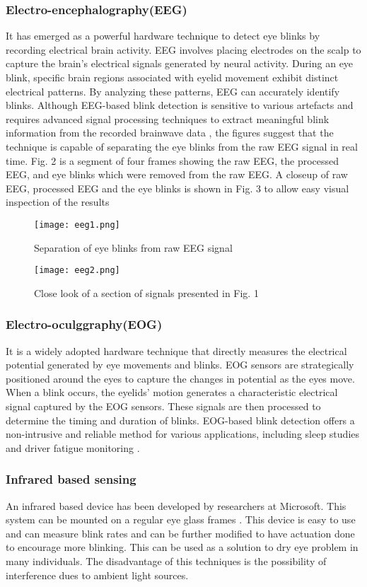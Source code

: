 \documentclass[conference]{IEEEtran}
\begin{document}
\subsubsection{Electro-encephalography(EEG)}
It has emerged as a
powerful hardware technique to detect eye blinks by recording
electrical brain activity. EEG involves placing electrodes on
the scalp to capture the brain’s electrical signals generated
by neural activity. During an eye blink, specific brain regions
associated with eyelid movement exhibit distinct electrical patterns. By analyzing these patterns, EEG can accurately identify blinks. Although EEG-based blink detection is sensitive to various artefacts and requires advanced signal processing techniques to extract meaningful blink information from the recorded brainwave data \cite {EEG2}, the figures suggest that the technique is capable of separating the eye blinks from the raw EEG signal in real time. Fig. 2 is a segment of four frames showing the raw EEG, the processed EEG, and eye blinks which were removed from the raw EEG. A closeup of raw EEG, processed EEG and the eye blinks is shown in Fig. 3 to allow easy visual inspection of the results \cite {EEG}

\begin{figure}[htbp]
\centerline{\texttt{[image: eeg1.png]}}
\caption{  Separation of eye blinks from raw EEG signal \cite {EEG}}
\label{fig2}
\end{figure}
\begin{figure}[htbp]
\centerline{\texttt{[image: eeg2.png]}}
\caption{ Close look of a section of signals presented in Fig. 1 \cite {EEG}}
\label{fig3}
\end{figure}
\subsubsection{Electro-oculggraphy(EOG)}
It is a widely adopted hardware technique that directly measures the electrical potential generated by eye movements and blinks. EOG sensors are strategically positioned around the eyes to capture the changes in potential as the eyes move. When a blink occurs, the eyelids' motion generates a characteristic electrical signal captured by the EOG sensors. These signals are then processed to determine the timing and duration of blinks. EOG-based blink detection offers a non-intrusive and reliable method for various applications, including sleep studies and driver fatigue monitoring \cite {EOG} \cite{eye blink duration by regression}.
\subsubsection{Infrared based sensing}
An infrared based device has been developed by researchers at Microsoft. This system can be mounted on a regular eye glass frames \cite{Microsoft}. This device is easy to use and can measure blink rates and can be further modified to have actuation done to encourage more blinking. This can be used as a solution to dry eye problem in many individuals. The disadvantage of this techniques is the possibility of interference dues to ambient light sources.
\end{document}
